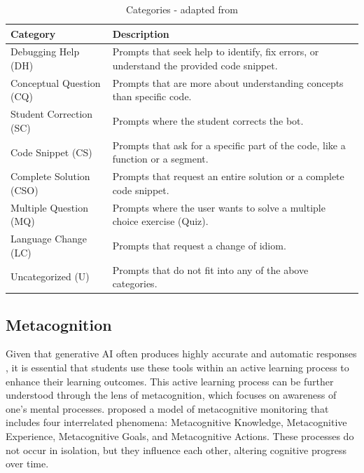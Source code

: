 \documentclass[a4paper,twoside]{article}
\begin{document}
\begin{table}[htbp]
  \caption{Categories - adapted from \cite{Ghimire24}}
  \begin{center}
    \renewcommand{\arraystretch}{1.6} %
    \begin{tabular}{p{4cm} p{12cm}} %
      \hline
      \textbf{Category} & \textbf{Description} \\
      \hline
      Debugging Help (DH) & Prompts that seek help to identify, fix errors, or understand the provided code snippet. \\
      Conceptual Question (CQ) & Prompts that are more about understanding concepts than specific code. \\
      Student Correction (SC) & Prompts where the student corrects the bot. \\
      Code Snippet  (CS) & Prompts that ask for a specific part of the code, like a function or a segment. \\
      Complete Solution (CSO) & Prompts that request an entire solution or a complete code snippet. \\
      Multiple Question (MQ) & Prompts where the user wants to solve a multiple choice exercise (Quiz). \\
      Language Change (LC) & Prompts that request a change of idiom. \\
      Uncategorized (U) & Prompts that do not fit into any of the above categories. \\
      \hline
    \end{tabular}
    \label{tab:categories}
  \end{center}
\end{table}

\subsection{Metacognition}

Given that generative AI often produces highly accurate and automatic responses
\citep{Puryear22}, it is essential that students use these tools within an
active learning process to enhance their learning outcomes. This active
learning process can be further understood through the lens of metacognition,
which focuses on awareness of one's mental processes. \cite{flavell79}
proposed a model of metacognitive monitoring that includes four interrelated
phenomena: Metacognitive Knowledge, Metacognitive Experience, Metacognitive
Goals, and Metacognitive Actions. These processes do not occur in isolation, but
they influence each other, altering cognitive progress over time.
\end{document}
